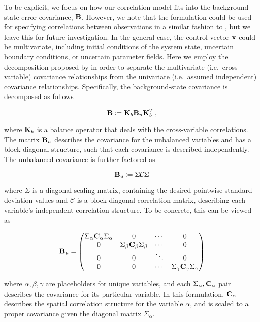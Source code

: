 To be explicit, we focus on how our correlation model fits into the
background-state error covariance, $\mathbf{B}$.
However, we note that the formulation could be used for specifying correlations
between observations in a similar fashion to \citet{guillet_modelling_2019}, but
we leave this for future investigation.
In the general case, the control vector $\mathbf{x}$ could be multivariate,
including initial conditions of the system state, uncertain boundary
conditions, or uncertain parameter fields.
Here we employ the decomposition proposed by
\citet{derber_reformulation_1999}
in order to separate the multivariate (i.e.\ cross-variable)
covariance relationships from the univariate (i.e.\ assumed
independent) covariance relationships.
Specifically, the background-state covariance is decomposed as follows
\begin{linenomath*}\begin{equation*}
    \mathbf{B} \coloneqq \mathbf{K}_{b}\mathbf{B}_{u}\mathbf{K}_{b}^T \,
    ,
\end{equation*}\end{linenomath*}
where $\mathbf{K}_{b}$ is a balance operator that deals with the
cross-variable correlations.
The matrix $\mathbf{B}_{u}$ describes the covariance for the unbalanced
variables and has a block-diagonal structure, such that each
covariance is described independently.
The unbalanced covariance is further factored as
\begin{linenomath*}\begin{equation*}
    \mathbf{B}_{u} \coloneqq \Sigma \mathcal{C} \Sigma
\end{equation*}\end{linenomath*}
where $\Sigma$ is a diagonal scaling matrix, containing the desired pointwise
standard deviation values and $\mathcal{C}$ is a block diagonal correlation matrix,
describing each variable's independent correlation structure.
To be concrete, this can be viewed as
\begin{linenomath*}\begin{equation*}
    \mathbf{B}_{u} =
    \begin{pmatrix}
        \Sigma_\alpha\mathbf{C}_\alpha\Sigma_\alpha & 0 & \cdots & 0 \\
        0 & \Sigma_\beta\mathbf{C}_\beta\Sigma_\beta & \cdots & 0 \\
        0 & 0 & \ddots & 0  \\
        0 & 0 & \cdots & \Sigma_\gamma\mathbf{C}_\gamma\Sigma_\gamma \\
    \end{pmatrix}
\end{equation*}\end{linenomath*}
where $\alpha, \beta, \gamma$ are placeholders for unique variables,
and each $\Sigma_\alpha, \mathbf{C}_\alpha$ pair describes the covariance for its
particular variable.
In this formulation, $\mathbf{C}_\alpha$ describes the spatial correlation
structure for the variable $\alpha$, and is scaled to a proper covariance given the
diagonal matrix $\Sigma_\alpha$.

